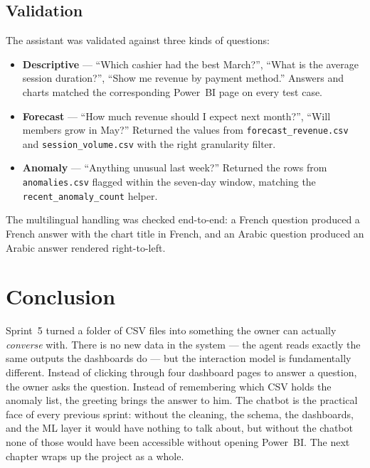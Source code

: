 \documentclass[12pt, a4paper]{report}
\begin{document}
\subsection{Validation}

The assistant was validated against three kinds of questions:

\begin{itemize}
  \item \textbf{Descriptive} --- ``Which cashier had the best March?'',
        ``What is the average session duration?'', ``Show me revenue by
        payment method.'' Answers and charts matched the corresponding
        Power~BI page on every test case.
  \item \textbf{Forecast} --- ``How much revenue should I expect next
        month?'', ``Will members grow in May?'' Returned the values
        from \texttt{forecast\_revenue.csv} and
        \texttt{session\_volume.csv} with the right granularity filter.
  \item \textbf{Anomaly} --- ``Anything unusual last week?'' Returned
        the rows from \texttt{anomalies.csv} flagged within the
        seven-day window, matching the \texttt{recent\_anomaly\_count}
        helper.
\end{itemize}

The multilingual handling was checked end-to-end: a French question
produced a French answer with the chart title in French, and an Arabic
question produced an Arabic answer rendered right-to-left.

\section{Conclusion}

Sprint~5 turned a folder of CSV files into something the owner can
actually \emph{converse} with. There is no new data in the system ---
the agent reads exactly the same outputs the dashboards do --- but the
interaction model is fundamentally different. Instead of clicking
through four dashboard pages to answer a question, the owner asks the
question. Instead of remembering which CSV holds the anomaly list, the
greeting brings the answer to him. The chatbot is the practical face
of every previous sprint: without the cleaning, the schema, the
dashboards, and the ML layer it would have nothing to talk about, but
without the chatbot none of those would have been accessible without
opening Power~BI. The next chapter wraps up the project as a whole.

\end{document}
